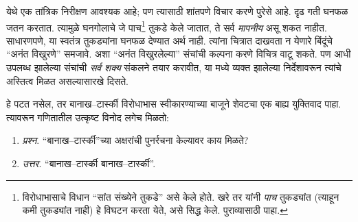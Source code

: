 \documentclass[../../../include/open-logic-section]{subfiles}
\begin{document}
येथे एक तांत्रिक निरीक्षण आवश्यक आहे; पण त्यासाठी शांतपणे विचार करणे पुरेसे आहे. दृढ गती घनफळ जतन करतात. त्यामुळे घनगोलाचे जे पाच\footnote{विरोधाभासाचे विधान “सांत संख्येने तुकडे” असे केले होते. खरे तर \citet{Robinson1947} यांनी \emph{पाच} तुकड्यांत (त्याहून कमी तुकड्यांत नाही) हे विघटन करता येते, असे सिद्ध केले. पुराव्यासाठी \citet[पृ.~66--7]{Wagon2016} पाहा.} तुकडे केले जातात, ते सर्व \emph{मापनीय} असू शकत नाहीत. साधारणपणे, या स्वतंत्र तुकड्यांना घनफळ देण्यात अर्थ नाही. त्यांना चित्रात दाखवता न येणारे बिंदूंचे “अनंत विखुरणे” समजावे. अशा “अनंत विखुरलेल्या” संचांची कल्पना करणे विचित्र वाटू शकते. पण आधी उपलब्ध झालेल्या संचांची \emph{सर्व शक्य} संकलने तयार करावीत, या \stagesacc{} मध्ये व्यक्त झालेल्या निर्देशावरून त्यांचे अस्तित्व मिळत असल्यासारखे दिसते.

हे पटत नसेल, तर बानाख--टार्स्की विरोधाभास स्वीकारण्याच्या बाजूने शेवटचा एक बाह्य युक्तिवाद पाहा. त्यावरून गणितातील उत्कृष्ट विनोद लगेच मिळतो:
\begin{enumerate}
	\item[] \emph{प्रश्न}. “बानाख--टार्स्की”च्या अक्षरांची पुनर्रचना केल्यावर काय मिळते?
	\item[] \emph{उत्तर}. “बानाख--टार्स्की बानाख--टार्स्की”.
\end{enumerate}
\end{document}
